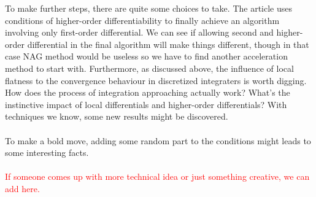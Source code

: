 \documentclass{article}
\begin{document}
To make further steps, there are quite some choices to take. The article uses conditions
of higher-order differentiability to finally achieve an algorithm involving only
first-order differential. We can see if allowing second and higher-order differential in
the final algorithm will make things different, though in that case NAG method
would be useless so we have to find another acceleration method to start with. Furthermore,
as discussed above, the influence of local flatness to the convergence behaviour in
discretized integraters is worth digging. How does the process of integration approaching
actually work? What's the instinctive impact of local differentials and higher-order
differentials? With techniques we know, some new results might be discovered.\\\\
To make a bold move, adding some random part to the conditions might leads to some
interesting facts.\\\\
\textcolor{red}{If someone comes up with more technical idea or just something creative,
  we can add here.}


\printbibliography
\end{document}
